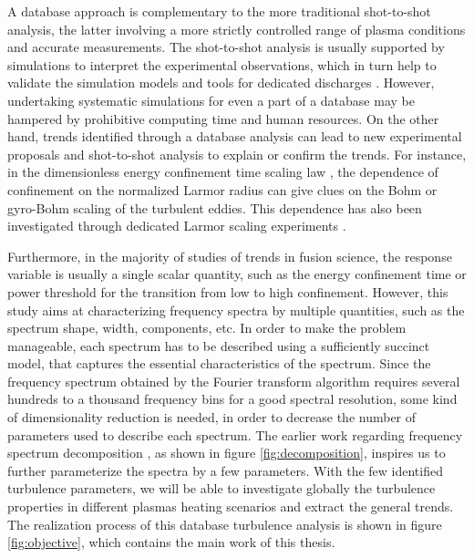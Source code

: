 A database approach is complementary to the more traditional shot-to-shot analysis, the latter involving a more strictly controlled range of plasma conditions and accurate measurements. The shot-to-shot analysis is usually supported by simulations to interpret the experimental observations, which in turn help to validate the simulation models and tools for dedicated discharges \cite{White_2008_PoP,Sung_2016_PoP,Holland_2016_PoP,Creely_2017_PoP}. However, undertaking systematic simulations for even a part of a database may be hampered by prohibitive computing time and human resources. On the other hand, trends identified through a database analysis can lead to new experimental proposals and shot-to-shot analysis to explain or confirm the trends. For instance, in the dimensionless energy confinement time scaling law \cite{Petty_1995_PoP}, the dependence of confinement on the normalized Larmor radius can give clues on the Bohm or gyro-Bohm scaling of the turbulent eddies. This dependence has also been investigated through dedicated Larmor scaling experiments \cite{Christiansen_1993_NF,Vlad_2005_PPCF}.


Furthermore, in the majority of studies of trends in fusion science, the response variable is usually a single scalar quantity, such as the energy confinement time or power threshold for the transition from low to high confinement. However, this study aims at characterizing frequency spectra by multiple quantities, such as the spectrum shape, width, components, etc. In order to make the problem manageable, each spectrum has to be described using a sufficiently succinct model, that captures the essential characteristics of the spectrum. Since the frequency spectrum obtained by the Fourier transform algorithm requires several hundreds to a thousand frequency bins for a good spectral resolution, some kind of dimensionality reduction is needed, in order to decrease the number of parameters used to describe each spectrum. The earlier work regarding frequency spectrum decomposition \cite{Vershkov_2005_NF,Vershkov_2011_NF, Kramer-Flecken_2004_NF,Kramer-Flecken_2015_NJP}, as shown in figure \ref{fig:decomposition}, inspires us to further parameterize the spectra by a few parameters. With the few identified turbulence parameters, we will be able to investigate globally the turbulence properties in different plasmas heating scenarios and extract the general trends. The realization process of this database turbulence analysis is shown in figure \ref{fig:objective}, which contains the main work of this thesis.


